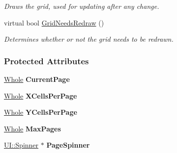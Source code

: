 \begin{DoxyCompactItemize}
\begin{DoxyCompactList}\small\item\em Draws the grid, used for updating after any change. \item\end{DoxyCompactList}\item 
\hypertarget{classphys_1_1UI_1_1PagedCellGrid_a31d1ab9c67af49b992162e84ad750356}{
virtual bool \hyperlink{classphys_1_1UI_1_1PagedCellGrid_a31d1ab9c67af49b992162e84ad750356}{GridNeedsRedraw} ()}
\label{classphys_1_1UI_1_1PagedCellGrid_a31d1ab9c67af49b992162e84ad750356}

\begin{DoxyCompactList}\small\item\em Determines whether or not the grid needs to be redrawn. \item\end{DoxyCompactList}\end{DoxyCompactItemize}
\subsubsection*{Protected Attributes}
\begin{DoxyCompactItemize}
\item 
\hypertarget{classphys_1_1UI_1_1PagedCellGrid_ae2ce49bd86b1c675b3a0eaef3252a9da}{
\hyperlink{namespacephys_a460f6bc24c8dd347b05e0366ae34f34a}{Whole} {\bfseries CurrentPage}}
\label{classphys_1_1UI_1_1PagedCellGrid_ae2ce49bd86b1c675b3a0eaef3252a9da}

\item 
\hypertarget{classphys_1_1UI_1_1PagedCellGrid_a914e320c60481730adde14b6db386882}{
\hyperlink{namespacephys_a460f6bc24c8dd347b05e0366ae34f34a}{Whole} {\bfseries XCellsPerPage}}
\label{classphys_1_1UI_1_1PagedCellGrid_a914e320c60481730adde14b6db386882}

\item 
\hypertarget{classphys_1_1UI_1_1PagedCellGrid_a27a1dd0c82747c04b3d4ff7f077f553b}{
\hyperlink{namespacephys_a460f6bc24c8dd347b05e0366ae34f34a}{Whole} {\bfseries YCellsPerPage}}
\label{classphys_1_1UI_1_1PagedCellGrid_a27a1dd0c82747c04b3d4ff7f077f553b}

\item 
\hypertarget{classphys_1_1UI_1_1PagedCellGrid_a8154eb0cf03edbe96f59d92b526058ef}{
\hyperlink{namespacephys_a460f6bc24c8dd347b05e0366ae34f34a}{Whole} {\bfseries MaxPages}}
\label{classphys_1_1UI_1_1PagedCellGrid_a8154eb0cf03edbe96f59d92b526058ef}

\item 
\hypertarget{classphys_1_1UI_1_1PagedCellGrid_a07b1db6a9b7adda5b66588fac8c7e4a1}{
\hyperlink{classphys_1_1UI_1_1Spinner}{UI::Spinner} $\ast$ {\bfseries PageSpinner}}
\label{classphys_1_1UI_1_1PagedCellGrid_a07b1db6a9b7adda5b66588fac8c7e4a1}

\end{DoxyCompactItemize}


